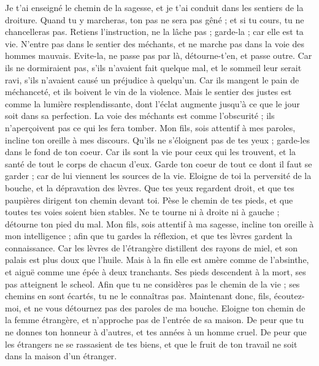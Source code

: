 \begin{multicols}{2}
Je t'ai enseigné le chemin de la sagesse, et je t'ai conduit dans les sentiers de la droiture.
Quand tu y marcheras, ton pas ne sera pas gêné ; et si tu cours, tu ne chancelleras pas.
Retiens l'instruction, ne la lâche pas ; garde-la ; car elle est ta vie.
N'entre pas dans le sentier des méchants, et ne marche pas dans la voie des hommes mauvais.
Evite-la, ne passe pas par là, détourne-t'en, et passe outre.
Car ils ne dormiraient pas, s'ils n'avaient fait quelque mal, et le sommeil leur serait ravi, s'ils n'avaient causé un préjudice à quelqu'un.
Car ils mangent le pain de méchanceté, et ils boivent le vin de la violence.
Mais le sentier des justes est comme la lumière resplendissante, dont l'éclat augmente jusqu'à ce que le jour soit dans sa perfection.
La voie des méchants est comme l'obscurité ; ils n'aperçoivent pas ce qui les fera tomber.
Mon fils, sois attentif à mes paroles, incline ton oreille à mes discours.
Qu'ils ne s'éloignent pas de tes yeux ; garde-les dans le fond de ton coeur.
Car ils sont la vie pour ceux qui les trouvent, et la santé de tout le corps de chacun d'eux.
Garde ton coeur de tout ce dont il faut se garder ; car de lui viennent les sources de la vie.
Eloigne de toi la perversité de la bouche, et la dépravation des lèvres.
Que tes yeux regardent droit, et que tes paupières dirigent ton chemin devant toi.
Pèse le chemin de tes pieds, et que toutes tes voies soient bien stables.
Ne te tourne ni à droite ni à gauche ; détourne ton pied du mal.
\VerseOne{}Mon fils, sois attentif à ma sagesse, incline ton oreille à mon intelligence ;
afin que tu gardes la réflexion, et que tes lèvres gardent la connaissance.
Car les lèvres de l'étrangère distillent des rayons de miel, et son palais est plus doux que l'huile.
Mais à la fin elle est amère comme de l'absinthe, et aiguë comme une épée à deux tranchants.
Ses pieds descendent à la mort, ses pas atteignent le scheol.
Afin que tu ne considères pas le chemin de la vie ; ses chemins en sont écartés, tu ne le connaîtras pas.
Maintenant donc, fils, écoutez-moi, et ne vous détournez pas des paroles de ma bouche.
Eloigne ton chemin de la femme étrangère, et n'approche pas de l'entrée de sa maison.
De peur que tu ne donnes ton honneur à d'autres, et tes années à un homme cruel.
De peur que les étrangers ne se rassasient de tes biens, et que le fruit de ton travail ne soit dans la maison d'un étranger.

\end{multicols}
